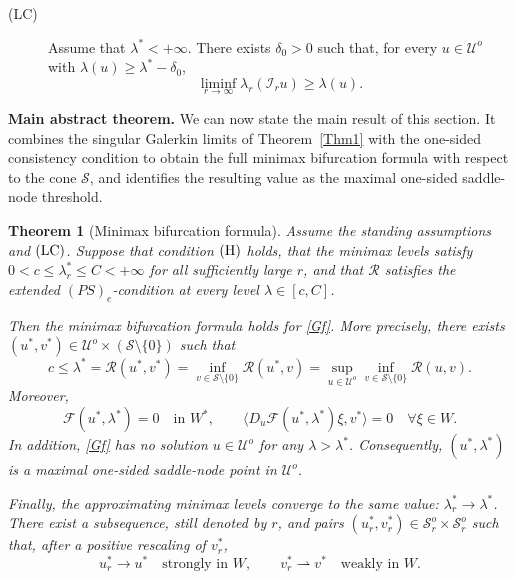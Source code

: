 \documentclass[preprint,10pt]{elsarticle}
\numberwithin{equation}{section}
\newtheorem{thm}{Theorem}[section]
\begin{document}
\begin{description}
	\item[{\rm (LC)}]
	Assume that \(\lambda^*<+\infty\). There exists \(\delta_0>0\) such that,
	for every \(u\in\mathcal U^o\) with
	\(\lambda(u)\ge\lambda^*-\delta_0\),
	\[
	\liminf_{r\to\infty}\lambda_r(\mathcal I_r u)
	\ge
	\lambda(u).
	\]
\end{description}

\medskip
\noindent\textbf{Main abstract theorem.}
We can now state the main result of this section. It combines the singular
Galerkin limits of Theorem~\ref{Thm1} with the one-sided consistency condition
to obtain the full minimax bifurcation formula with respect to the cone
\(\mathcal S\), and identifies the resulting value as the maximal one-sided
saddle-node threshold.

\begin{thm}[Minimax bifurcation formula]
	\label{Thm2}
	Assume the standing assumptions and \({\rm (LC)}\). Suppose that condition
	\({\rm (H)}\) holds, that the minimax levels satisfy
	\(0<c\le\lambda_r^*\le C<+\infty\) for all sufficiently large \(r\), and
	that \(\mathcal R\) satisfies the extended \((PS)_e\)-condition at every
	level \(\lambda\in[c,C]\).
	
	Then the minimax bifurcation formula holds for \eqref{Gf}. More precisely,
	there exists
	\((u^*,v^*)\in\mathcal U^o\times(\mathcal S\setminus\{0\})\) such that
	\begin{equation}\label{MBFThm}
		c\le \lambda^*
		=
		\mathcal R(u^*,v^*)
		=
		\inf_{v\in\mathcal S\setminus\{0\}}\mathcal R(u^*,v)
		=
		\sup_{u\in\mathcal U^o}
		\inf_{v\in\mathcal S\setminus\{0\}}
		\mathcal R(u,v).
	\end{equation}
	Moreover,
	\[
	\mathcal F(u^*,\lambda^*)=0
	\quad\text{in }W^*,
	\qquad
	\bigl\langle
	D_u\mathcal F(u^*,\lambda^*)\xi,v^*
	\bigr\rangle=0
	\quad \forall \xi\in W .
	\]
	In addition, \eqref{Gf} has no solution \(u\in\mathcal U^o\) for any
	\(\lambda>\lambda^*\). Consequently, \((u^*,\lambda^*)\) is a maximal
	one-sided saddle-node point in \(\mathcal U^o\).
	
	Finally, the approximating minimax levels converge to the same value:
	\(\lambda_r^*\to\lambda^*\). There exist a subsequence, still denoted by
	\(r\), and pairs
	\((u_r^*,v_r^*)\in\mathcal S_r^o\times\mathcal S_r^o\) such that, after a
	positive rescaling of \(v_r^*\),
	\[
	u_r^*\to u^* \quad\text{strongly in }W,
	\qquad
	v_r^*\rightharpoonup v^* \quad\text{weakly in }W .
	\]
\end{thm}
\end{document}
